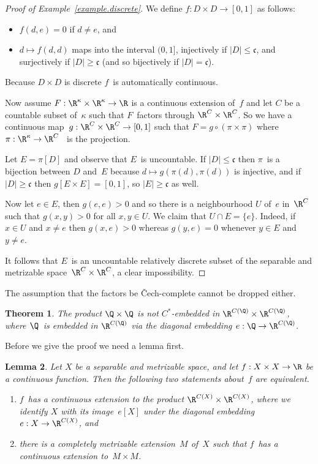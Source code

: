 \documentclass[a4paper]{amsart}
\newcommand\cee{\mathfrak{c}}
\theoremstyle{plain}
\newtheorem{theorem}{Theorem}[section]
\newtheorem{lemma}[theorem]{Lemma}
\theoremstyle{definition}
\theoremstyle{remark}
\begin{document}
\begin{proof}[Proof of Example~\ref{example.discrete}]
We define $f:D\times D\to[0,1]$ as follows:
\begin{itemize}
\item $f(d,e)=0$ if $d\neq e$, and
\item $d\mapsto f(d,d)$ maps into the interval $(0,1]$, 
     injectively if $|D|\le\cee$, and  
     surjectively if $|D|\ge\cee$ (and so bijectively if $|D|=\cee$).
\end{itemize}
Because $D\times D$ is discrete $f$~is automatically continuous.

Now assume $F:\R^\kappa\times\R^\kappa\to\R$ is a continuous extension of~$f$ and
let $C$ be a countable subset of~$\kappa$ such that $F$~factors through 
$\R^C\times\R^C$.
So we have a continuous map~$g:\R^C\times\R^C\to[0,1]$ such 
that $F=g\circ(\pi\times\pi)$ where $\pi:\R^\kappa\to\R^C$ ~is the projection.

Let $E=\pi[D]$ and observe that $E$~is uncountable.
If $|D|\le\cee$ then $\pi$~is a bijection between $D$ and~$E$ because
$d\mapsto g(\pi(d),\pi(d))$ is injective, and if $|D|\ge\cee$ 
then $g[E\times E]=[0,1]$, so $|E|\ge\cee$ as well.

Now let $e\in E$, then $g(e,e)>0$ and so there is a neighbourhood $U$ of~$e$
in~$\R^C$ such that $g(x,y)>0$ for all $x,y\in U$.
We claim that $U\cap E=\{e\}$.
Indeed, if $x\in U$ and $x\neq e$ then $g(x,e)>0$ whereas $g(y,e)=0$ whenever
$y\in E$ and $y\neq e$.

It follows that $E$~is an uncountable relatively discrete subset of the
separable and metrizable space~$\R^C\times\R^C$, a clear impossibility.
\end{proof}

The assumption that the factors be \v{C}ech-complete cannot be dropped either.

\begin{theorem}
The product $\Q\times\Q$ is not $C^*$-embedded in $\R^{C(\Q)}\times\R^{C(\Q)}$,
where $\Q$~is embedded in $\R^{C(\Q)}$ via the diagonal embedding
$e:\Q\to\R^{C(\Q)}$. \label{thm.QxQ}
\end{theorem}

Before we give the proof we need a lemma first.

\begin{lemma}\label{X.extend}
Let $X$ be a separable and metrizable space, and 
let $f:X\times X\to\R$ be a continuous function.
Then the following two statements about~$f$ are equivalent.
\begin{enumerate}
\item $f$~has a continuous extension to the 
      product\/ $\R^{C(X)}\times\R^{C(X)}$, where we identify $X$ with its 
      image~$e[X]$ under the diagonal embedding $e:X\to\R^{C(X)}$,
      and
\item there is a completely metrizable extension~$M$ of~$X$ such that 
      $f$~has a continuous extension to~$M\times M$.
\end{enumerate}
\end{lemma}
\end{document}

